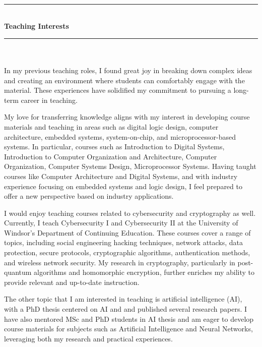  \newpage \thispagestyle{empty}
 \phantom \quad \\
\hrule \phantom \quad  \vspace*{1\baselineskip}  \\
 {\bf Teaching Interests}
 \vspace*{1\baselineskip}  \hrule \phantom \quad \\
\vspace*{3\baselineskip} \phantom \quad \\
In my previous teaching roles, I found great joy in breaking down complex ideas and creating an environment where students can comfortably engage with the material. These experiences have solidified my commitment to pursuing a long-term career in teaching.

My love for transferring knowledge aligns with my interest in developing course materials and teaching in areas such as digital logic design, computer architecture, embedded systems, system-on-chip, and microprocessor-based systems.
In particular, courses such as Introduction to Digital Systems, Introduction to Computer Organization and Architecture,  Computer Organization, Computer Systems Design,  Microprocessor Systems. Having taught courses like Computer Architecture and Digital Systems, and with industry experience focusing on embedded systems and logic design, I feel  prepared to offer a new perspective based on industry applications. 

I would enjoy teaching courses related to cybersecurity and cryptography as well. Currently, I teach Cybersecurity I and Cybersecurity II at the University of Windsor's Department of Continuing Education. These courses cover a range of topics, including social engineering hacking techniques, network attacks, data protection, secure protocols, cryptographic algorithms, authentication methods, and wireless network security. My research in cryptography, particularly in post-quantum algorithms and homomorphic encryption, further enriches my ability to provide relevant and up-to-date instruction.

The other topic that I am interested in teaching is artificial intelligence (AI), with a PhD thesis centered on AI and
 and published several research papers. I have also mentored MSc and PhD students in AI thesis and am eager to develop course materials for subjects such as Artificial Intelligence and Neural Networks, leveraging both my research and practical experiences.

